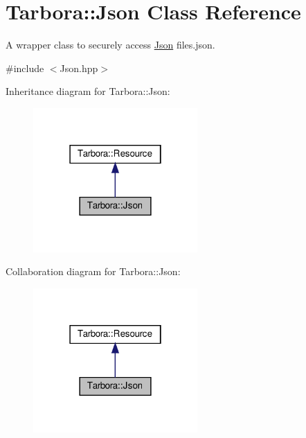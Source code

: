 \hypertarget{classTarbora_1_1Json}{}\section{Tarbora\+:\+:Json Class Reference}
\label{classTarbora_1_1Json}


A wrapper class to securely access \hyperlink{classTarbora_1_1Json}{Json} files.\+json.  




{\ttfamily \#include $<$Json.\+hpp$>$}



Inheritance diagram for Tarbora\+:\+:Json\+:\nopagebreak
\begin{figure}[H]
\begin{center}
\leavevmode
\includegraphics[width=178pt]{classTarbora_1_1Json__inherit__graph}
\end{center}
\end{figure}


Collaboration diagram for Tarbora\+:\+:Json\+:\nopagebreak
\begin{figure}[H]
\begin{center}
\leavevmode
\includegraphics[width=178pt]{classTarbora_1_1Json__coll__graph}
\end{center}
\end{figure}
